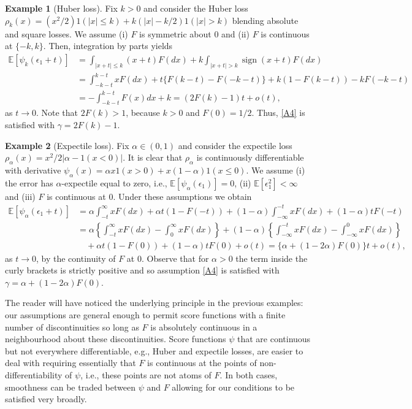 \documentclass[11pt]{article}
\theoremstyle{definition}
\newtheorem{lossexampleinner}{Example}
\newenvironment{lossexample}
  {\begin{lossexampleinner}}
  {\end{lossexampleinner}}
\theoremstyle{remark}
\DeclareMathOperator{\sign}{sign}
\begin{document}
\begin{lossexample}[Huber loss]
Fix $k>0$ and consider the Huber loss  $\rho_k(x) = (x^2/2) 1(|x| \leq k) + k(|x| - k/2) 1(|x|>k)$ blending absolute and square losses. We assume (i) $F$ is symmetric about $0$ and (ii) $F$ is continuous at $\{-k,k\}$. Then, integration by parts yields
\begin{align*}
\mathbb{E}[\psi_k(\epsilon_1+t) ] & = \int_{|x+t|\leq k} (x+t) F(dx) + k\int_{|x+t|> k} \sign(x+t) F(dx) 
\\ & = \int_{-k-t}^{k-t} x F(dx) + t\{F(k-t) -F(-k-t)\} + k(1-F(k-t))-kF(-k-t)
\\ & = -\int_{-k-t}^{k-t} F(x) d x + k = (2F(k)-1)t + o(t),
\end{align*}
as $t \to 0$. Note that $2F(k)>1$, because $k>0$ and $F(0)=1/2$. Thus, \ref{A4} is satisfied with $\gamma = 2F(k)-1$.
\end{lossexample}

\begin{lossexample}[Expectile loss] Fix $\alpha \in (0,1)$ and consider the expectile loss $\rho_{\alpha}(x) = x^2/2|\alpha-1(x < 0)|$. It is clear that $\rho_{\alpha}$ is continuously differentiable with derivative $\psi_{\alpha}(x) = \alpha x 1(x>0) + x(1-\alpha) 1(x \leq 0)$. We assume (i) the error has $\alpha$-expectile equal to zero, i.e., $\mathbb{E}[\psi_{\alpha}(\epsilon_1)] = 0$, (ii) $\mathbb{E}[\epsilon_1^2] < \infty$ and (iii) $F$ is continuous at $0$. Under these assumptions we obtain
\begin{align*}
\mathbb{E}[\psi_{\alpha}(\epsilon_1 +t)] & = \alpha \int_{-t}^{\infty} x F(dx) + \alpha t(1-F(-t)) + (1-\alpha) \int_{-\infty}^{-t} x F(dx) + (1-\alpha) t F(-t)
\\ & = \alpha \left\{ \int_{-t}^{\infty} x F(dx) - \int_{0}^{\infty} x F(dx) \right\} + (1-\alpha) \left\{\int_{-\infty}^{-t} x F(dx) - \int_{-\infty}^{0} x F(dx) \right\}
\\ & \quad + \alpha t (1-F(0)) + (1-\alpha) tF(0) + o(t) = \{\alpha+(1-2\alpha)F(0)\}t+o(t),
\end{align*}
as $t \to 0$, by the continuity of $F$ at $0$. Observe that for $\alpha>0$ the term inside the curly brackets is strictly positive and so assumption \ref{A4} is satisfied with $\gamma = \alpha + (1-2 \alpha)F(0)$.
\end{lossexample}

The reader will have noticed the underlying principle in the previous examples: our assumptions are general enough to permit score functions with a finite number of discontinuities so long as $F$ is absolutely continuous in a neighbourhood about these discontinuities. Score functions $\psi$ that are continuous but not everywhere differentiable, e.g., Huber and expectile losses, are easier to deal with requiring essentially that $F$ is continuous at the points of non-differentiability of $\psi$, i.e., these points are not atoms of $F$. In both cases, smoothness can be traded between $\psi$ and $F$ allowing for our conditions to be satisfied very broadly.
\end{document}
